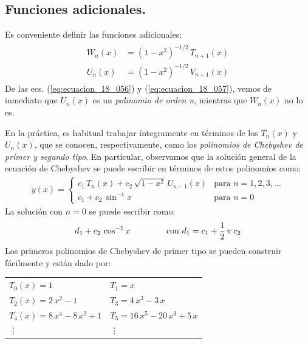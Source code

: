 \documentclass[12pt]{article}
\numberwithin{equation}{section}
\begin{document}
\subsection{Funciones adicionales.}

Es conveniente definir las funciones adicionales:
\begin{align}
\begin{aligned}
W_{n} (x) &= (1 - x^{2})^{-1/2} \, T_{n+1} (x) \\[0.5em]
U_{n} (x) &= (1 - x^{2})^{-1/2} \, V_{n+1} (x)
\end{aligned}
\label{eq:ecuacion_18_058}
\end{align}
De las ecs. (\ref{eq:ecuacion_18_056}) y (\ref{eq:ecuacion_18_057}), vemos de inmediato que $U_{n}(x)$ es un \emph{polinomio de orden n}, mientras que $W_{n}(x)$ no lo es.
\par
En la práctica, es habitual trabajar íntegramente en términos de los $T_{n} (x)$ y $U_{n} (x)$, que se conocen, respectivamente, como los \emph{polinomios de Chebyshev de primer y segundo tipo}. En particular, observamos que la solución general de la ecuación de Chebyshev se puede escribir en términos de estos polinomios como:
\begin{align*}
y(x) = \begin{cases}
c_{1} \, T_{n} (x) + c_{2} \, \sqrt{1 -x^{2}} \, U_{n-1} (x) & \mbox{para  } n = 1, 2, 3, \ldots \\[0.5em]
c_{1} + c_{2} \, \sin^{-1} x & \mbox{para  } n = 0
\end{cases}
\end{align*}
La solución con $n = 0$ se puede escribir como:
\begin{align*}
d_{1} + c_{2} \, \cos^{-1} x \hspace{1.5cm} \mbox{con  } d_{1} = c_{1} + \dfrac{1}{2} \, \pi \, c_{2}
\end{align*}
Los primeros polinomios de Chebyshev de primer tipo se pueden construir fácilmente y están dado por:
\begin{table}[H]
\centering
\fontsize{14}{14}\selectfont
\begin{tabular}{p{6cm} p{6cm}}
$T_{0}(x) = 1$ & $T_{1} = x$ \\[0.5em]
$T_{2}(x) = 2 \, x^{2} - 1$ & $T_{3} = 4 \, x^{3} - 3 \, x$ \\[0.5em]
$T_{4}(x) = 8 \, x^{4} - 8 \, x^{2} + 1$ & $T_{5} = 16 \, x^{5} - 20 \, x^{3} + 5 \, x$ \\[0.5em]
\vdots & \vdots
\end{tabular}
\end{table}
\end{document}
